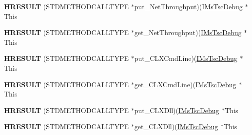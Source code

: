 \begin{DoxyCompactItemize}
\item 
\mbox{\label{struct_m_s_t_s_c_lib_1_1_i_ms_tsc_debug_vtbl_a172fee32d72fcb9d3b5ca844ca8fc3cf}} 
{\bfseries H\+R\+E\+S\+U\+LT} (S\+T\+D\+M\+E\+T\+H\+O\+D\+C\+A\+L\+L\+T\+Y\+PE $\ast$put\+\_\+\+Net\+Throughput)(\hyperlink{interface_m_s_t_s_c_lib_1_1_i_ms_tsc_debug}{I\+Ms\+Tsc\+Debug} $\ast$This
\item 
\mbox{\label{struct_m_s_t_s_c_lib_1_1_i_ms_tsc_debug_vtbl_ae79e4de5ad500e799812b2d6cb38c4bf}} 
{\bfseries H\+R\+E\+S\+U\+LT} (S\+T\+D\+M\+E\+T\+H\+O\+D\+C\+A\+L\+L\+T\+Y\+PE $\ast$get\+\_\+\+Net\+Throughput)(\hyperlink{interface_m_s_t_s_c_lib_1_1_i_ms_tsc_debug}{I\+Ms\+Tsc\+Debug} $\ast$This
\item 
\mbox{\label{struct_m_s_t_s_c_lib_1_1_i_ms_tsc_debug_vtbl_abfa92c6550f199e406fa82c1be613b66}} 
{\bfseries H\+R\+E\+S\+U\+LT} (S\+T\+D\+M\+E\+T\+H\+O\+D\+C\+A\+L\+L\+T\+Y\+PE $\ast$put\+\_\+\+C\+L\+X\+Cmd\+Line)(\hyperlink{interface_m_s_t_s_c_lib_1_1_i_ms_tsc_debug}{I\+Ms\+Tsc\+Debug} $\ast$This
\item 
\mbox{\label{struct_m_s_t_s_c_lib_1_1_i_ms_tsc_debug_vtbl_aa3bf0f9538b14bb3a467d3df8b52d1d9}} 
{\bfseries H\+R\+E\+S\+U\+LT} (S\+T\+D\+M\+E\+T\+H\+O\+D\+C\+A\+L\+L\+T\+Y\+PE $\ast$get\+\_\+\+C\+L\+X\+Cmd\+Line)(\hyperlink{interface_m_s_t_s_c_lib_1_1_i_ms_tsc_debug}{I\+Ms\+Tsc\+Debug} $\ast$This
\item 
\mbox{\label{struct_m_s_t_s_c_lib_1_1_i_ms_tsc_debug_vtbl_a2e4431a964506688257854a2d379588f}} 
{\bfseries H\+R\+E\+S\+U\+LT} (S\+T\+D\+M\+E\+T\+H\+O\+D\+C\+A\+L\+L\+T\+Y\+PE $\ast$put\+\_\+\+C\+L\+X\+Dll)(\hyperlink{interface_m_s_t_s_c_lib_1_1_i_ms_tsc_debug}{I\+Ms\+Tsc\+Debug} $\ast$This
\item 
\mbox{\label{struct_m_s_t_s_c_lib_1_1_i_ms_tsc_debug_vtbl_ad4af4160e0a7cfd4d04b6998b5cc30bc}} 
{\bfseries H\+R\+E\+S\+U\+LT} (S\+T\+D\+M\+E\+T\+H\+O\+D\+C\+A\+L\+L\+T\+Y\+PE $\ast$get\+\_\+\+C\+L\+X\+Dll)(\hyperlink{interface_m_s_t_s_c_lib_1_1_i_ms_tsc_debug}{I\+Ms\+Tsc\+Debug} $\ast$This
\end{DoxyCompactItemize}
